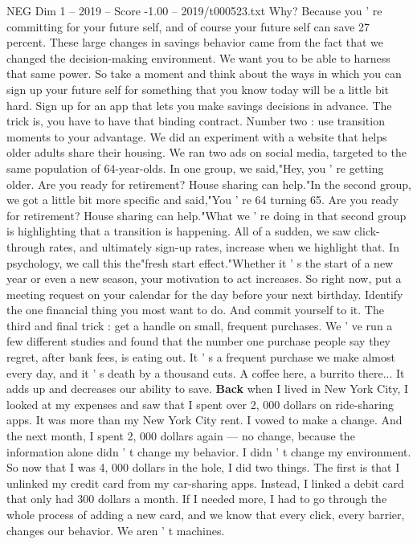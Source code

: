 \begin{textsample}{NEG Dim 1 – 2019 – Score -1.00 – 2019/t000523.txt}
Why?
Because you ' re committing for your future self, and of course your future self can save 27 percent.
These large changes in savings behavior came from the fact that we changed the decision-making environment.
We want you to be able to harness that same power.
So take a moment and think about the ways in which you can sign up your future self for something that you know today will be a little bit hard.
Sign up for an app that lets you make savings decisions in advance.
The trick is, you have to have that binding contract.
Number two : use transition moments to your advantage.
We did an experiment with a website that helps older adults share their housing.
We ran two ads on social media, targeted to the same population of 64-year-olds.
In one group, we said,"Hey, you ' re getting older.
Are you ready for retirement?
House sharing can help."In the second group, we got a little bit more specific and said,"You ' re 64 turning 65.
Are you ready for retirement?
House sharing can help."What we ' re doing in that second group is highlighting that a transition is happening.
All of a sudden, we saw click-through rates, and ultimately sign-up rates, increase when we highlight that.
In psychology, we call this the"fresh start effect."Whether it ' s the start of a new year or even a new season, your motivation to act increases.
So right now, put a meeting request on your calendar for the day before your next birthday.
Identify the one financial thing you most want to do.
And commit yourself to it.
The third and final trick : get a handle on small, frequent purchases.
We ' ve run a few different studies and found that the number one purchase people say they regret, after bank fees, is eating out.
It ' s a frequent purchase we make almost every day, and it ' s death by a thousand cuts.
A coffee here, a burrito there...
It adds up and decreases our ability to save. \textbf{Back} when I lived in New York City, I looked at my expenses and saw that I spent over 2, 000 dollars on ride-sharing apps.
It was more than my New York City rent.
I vowed to make a change.
And the next month, I spent 2, 000 dollars again — no change, because the information alone didn ' t change my behavior.
I didn ' t change my environment.
So now that I was 4, 000 dollars in the hole, I did two things.
The first is that I unlinked my credit card from my car-sharing apps.
Instead, I linked a debit card that only had 300 dollars a month.
If I needed more, I had to go through the whole process of adding a new card, and we know that every click, every barrier, changes our behavior.
We aren ' t machines.

\end{textsample}
